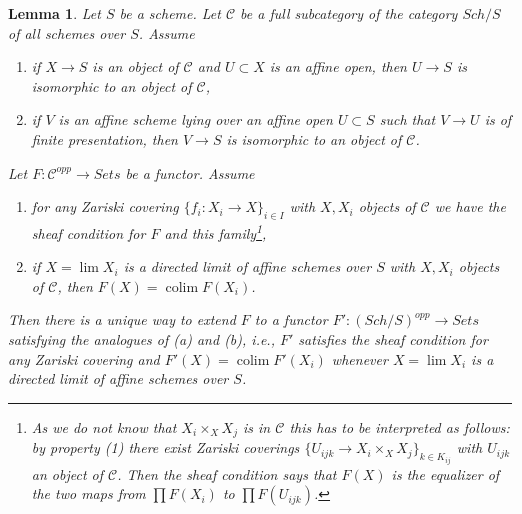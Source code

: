 \documentclass{stacks-project}
\theoremstyle{plain}
\newtheorem{lemma}[subsection]{Lemma}
\theoremstyle{definition}
\theoremstyle{remark}
\numberwithin{equation}{subsection}
\def\lim{\mathop{\mathrm{lim}}\nolimits}
\def\colim{\mathop{\mathrm{colim}}\nolimits}
\def\Sch{\mathit{Sch}}
\begin{document}
\begin{lemma}
\label{lemma-extend}
Let $S$ be a scheme. Let $\mathcal{C}$ be a full subcategory
of the category $\Sch/S$ of all schemes over $S$. Assume
\begin{enumerate}
\item if $X \to S$ is an object of $\mathcal{C}$ and
$U \subset X$ is an affine open, then $U \to S$ is isomorphic
to an object of $\mathcal{C}$,
\item if $V$ is an affine scheme lying over an affine open $U \subset S$
such that $V \to U$ is of finite presentation, then $V \to S$ is isomorphic
to an object of $\mathcal{C}$.
\end{enumerate}
Let $F : \mathcal{C}^{opp} \to \textit{Sets}$ be a functor.
Assume
\begin{enumerate}
\item[(a)] for any Zariski covering $\{f_i : X_i \to X\}_{i \in I}$
with $X, X_i$ objects of $\mathcal{C}$ we have
the sheaf condition for $F$ and this family\footnote{As we
do not know that $X_i \times_X X_j$ is in $\mathcal{C}$
this has to be interpreted as follows: by property (1)
there exist Zariski coverings $\{U_{ijk} \to X_i \times_X X_j\}_{k \in K_{ij}}$
with $U_{ijk}$ an object of $\mathcal{C}$. Then the sheaf condition
says that $F(X)$ is the equalizer of the two maps
from $\prod F(X_i)$ to $\prod F(U_{ijk})$.},
\item[(b)] if $X = \lim X_i$ is a directed limit of affine schemes
over $S$ with $X, X_i$ objects of $\mathcal{C}$, then
$F(X) = \colim F(X_i)$.
\end{enumerate}
Then there is a unique way to extend $F$ to a functor
$F' : (\Sch/S)^{opp} \to \textit{Sets}$ satisfying the analogues of
(a) and (b), i.e., $F'$ satisfies the sheaf condition for any
Zariski covering and $F'(X) = \colim F'(X_i)$ whenever $X = \lim X_i$
is a directed limit of affine schemes over $S$.
\end{lemma}
\end{document}
